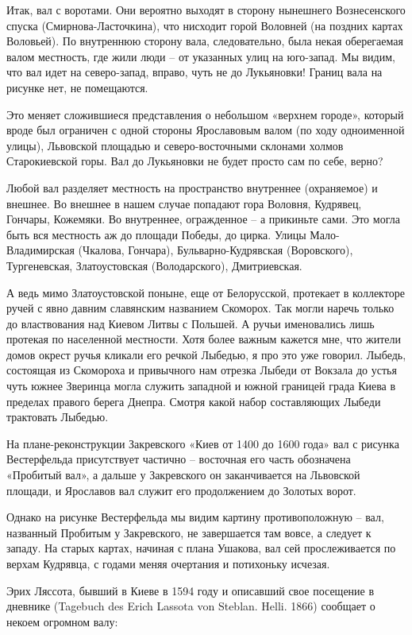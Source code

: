 Итак, вал с воротами. Они вероятно выходят в сторону нынешнего Вознесенского спуска (Смирнова-Ласточ\-кина), что нисходит горой Воловней (на поздних картах Воловьей). По внутреннюю сторону вала, следовательно, была некая оберегаемая валом местность, где жили люди – от указанных улиц на юго-запад. Мы видим, что вал идет на северо-запад, вправо, чуть не до Лукьяновки! Границ вала на рисунке нет, не помещаются.

Это меняет сложившиеся представления о небольшом «верхнем городе», который вроде был ограничен с одной стороны Ярославовым валом (по ходу одноименной улицы), Львовской площадью и северо-восточными склонами холмов Старокиевской горы. Вал до Лукьяновки не будет просто сам по себе, верно?

Любой вал разделяет местность на пространство внутреннее (охраняемое) и внешнее. Во внешнее в нашем случае попадают гора Воловня, Кудрявец, Гончары, Кожемяки. Во внутреннее, огражденное – а прикиньте сами. Это могла быть вся местность аж до площади Победы, до цирка. Улицы Мало-Владимирская (Чкалова, Гончара), Бульварно-Кудрявская (Воровского), Тургеневская, Златоустовская (Володарского), Дмитриевская.

А ведь мимо Златоустовской поныне, еще от Белорусской, протекает в коллекторе ручей с явно давним славянским названием Скоморох. Так могли наречь только до властвования над Киевом Литвы с Польшей. А ручьи именовались лишь протекая по населенной местности. Хотя более важным кажется мне, что жители домов окрест ручья кликали его речкой Лыбедью, я про это уже говорил. Лыбедь, состоящая из Скомороха и привычного нам отрезка Лыбеди от Вокзала до устья чуть южнее Зверинца могла служить западной и южной границей града Киева в пределах правого берега Днепра. Смотря какой набор составляющих Лыбеди трактовать Лыбедью.

На плане-реконструкции Закревского «Киев от 1400 до 1600 года» вал с рисунка Вестерфельда присутствует частично – восточная его часть обозначена «Пробитый вал», а дальше у Закревского он заканчивается на Львовской площади, и Ярославов вал служит его продолжением до Золотых ворот. 

Однако на рисунке Вестерфельда мы видим картину противоположную – вал, названный Пробитым у Закревского, не завершается там вовсе, а следует к западу. На старых картах, начиная с плана Ушакова, вал сей прослеживается по верхам Кудрявца, с годами меняя очертания и потихоньку исчезая.

Эрих Ляссота, бывший в Киеве в 1594 году и описавший свое посещение в дневнике (Tagebuch des Erich Lassota von Steblan. Helli. 1866) сообщает о некоем огромном валу:

